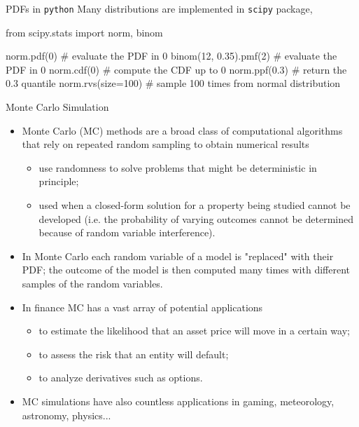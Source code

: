 \documentclass{beamer}
\begin{document}
\begin{frame}[fragile]{PDFs in \texttt{python}}
    Many distributions are implemented in \texttt{scipy} package,
\begin{ipython}
from scipy.stats import norm, binom
     
norm.pdf(0)   				# evaluate the PDF in 0
binom(12, 0.35).pmf(2)		# evaluate the PDF in 0
norm.cdf(0)					# compute the CDF up to 0
norm.ppf(0.3)               # return the 0.3 quantile
norm.rvs(size=100)          # sample 100 times from normal distribution
\end{ipython}
\end{frame}

\begin{frame}{Monte Carlo Simulation}
    \begin{itemize}
    \item Monte Carlo (MC) methods are a broad class of computational algorithms that rely on repeated random sampling to obtain numerical results
    \begin{itemize}
        \item use randomness to solve problems that might be deterministic in principle;
        \item used when a closed-form solution for a property being studied cannot be developed (i.e. the probability of varying outcomes cannot be determined because of random variable interference). 
     \end{itemize}
    \item In Monte Carlo each random variable of a model is "replaced" with their PDF; the outcome of the model is then computed many times with different samples of the random variables. 
    \item In finance MC has a vast array of potential applications
    \begin{itemize}
        \item to estimate the likelihood that an asset price will move in a certain way;
        \item to assess the risk that an entity will default;
        \item to analyze derivatives such as options.
     \end{itemize}
    \item MC simulations have also countless applications in gaming, meteorology, astronomy, physics...
    \end{itemize}
\end{frame}
\end{document}
